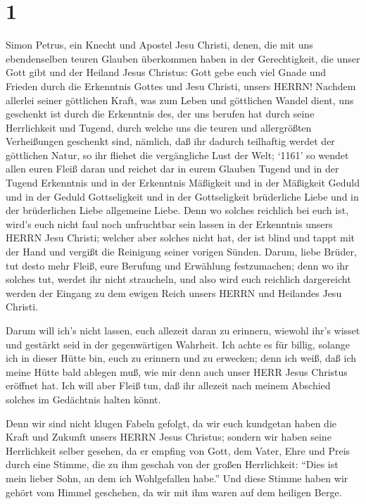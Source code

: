 \hypertarget{section}{%
\section{1}\label{section}}

 Simon Petrus, ein Knecht und Apostel Jesu Christi, denen,
die mit uns ebendenselben teuren Glauben überkommen haben in der
Gerechtigkeit, die unser Gott gibt und der Heiland Jesus Christus:
 Gott gebe euch viel Gnade und Frieden durch die Erkenntnis
Gottes und Jesu Christi, unsers HERRN!  Nachdem allerlei
seiner göttlichen Kraft, was zum Leben und göttlichen Wandel dient, uns
geschenkt ist durch die Erkenntnis des, der uns berufen hat durch seine
Herrlichkeit und Tugend,  durch welche uns die teuren und
allergrößten Verheißungen geschenkt sind, nämlich, daß ihr dadurch
teilhaftig werdet der göttlichen Natur, so ihr fliehet die vergängliche
Lust der Welt;  `1161' so wendet allen euren Fleiß daran und
reichet dar in eurem Glauben Tugend und in der Tugend Erkenntnis
 und in der Erkenntnis Mäßigkeit und in der Mäßigkeit Geduld
und in der Geduld Gottseligkeit  und in der Gottseligkeit
brüderliche Liebe und in der brüderlichen Liebe allgemeine Liebe.
 Denn wo solches reichlich bei euch ist, wird's euch nicht
faul noch unfruchtbar sein lassen in der Erkenntnis unsers HERRN Jesu
Christi;  welcher aber solches nicht hat, der ist blind und
tappt mit der Hand und vergißt die Reinigung seiner vorigen Sünden.
 Darum, liebe Brüder, tut desto mehr Fleiß, eure Berufung
und Erwählung festzumachen; denn wo ihr solches tut, werdet ihr nicht
straucheln,  und also wird euch reichlich dargereicht
werden der Eingang zu dem ewigen Reich unsers HERRN und Heilandes Jesu
Christi.

 Darum will ich's nicht lassen, euch allezeit daran zu
erinnern, wiewohl ihr's wisset und gestärkt seid in der gegenwärtigen
Wahrheit.  Ich achte es für billig, solange ich in dieser
Hütte bin, euch zu erinnern und zu erwecken;  denn ich
weiß, daß ich meine Hütte bald ablegen muß, wie mir denn auch unser HERR
Jesus Christus eröffnet hat.  Ich will aber Fleiß tun, daß
ihr allezeit nach meinem Abschied solches im Gedächtnis halten könnt.

 Denn wir sind nicht klugen Fabeln gefolgt, da wir euch
kundgetan haben die Kraft und Zukunft unsers HERRN Jesus Christus;
sondern wir haben seine Herrlichkeit selber gesehen,  da er
empfing von Gott, dem Vater, Ehre und Preis durch eine Stimme, die zu
ihm geschah von der großen Herrlichkeit: ``Dies ist mein lieber Sohn, an
dem ich Wohlgefallen habe.''  Und diese Stimme haben wir
gehört vom Himmel geschehen, da wir mit ihm waren auf dem heiligen
Berge.

